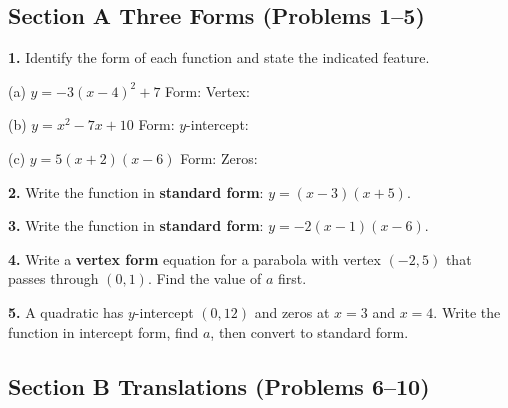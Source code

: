 \documentclass[11pt]{article}
\newcommand{\ws}[1][3cm]{\vspace{#1}}
\begin{document}
\subsection*{Section A \quad Three Forms (Problems 1--5)}

\textbf{1.} Identify the form of each function and state the indicated feature.

\hspace{1cm}(a) $y = -3(x-4)^2 + 7$ \hspace{1cm} Form: \underline{\hspace{3cm}} \hspace{0.5cm} Vertex: \underline{\hspace{2.5cm}}

\hspace{1cm}(b) $y = x^2 - 7x + 10$ \hspace{1.2cm} Form: \underline{\hspace{3cm}} \hspace{0.5cm} $y$-intercept: \underline{\hspace{1.5cm}}

\hspace{1cm}(c) $y = 5(x+2)(x-6)$ \hspace{1.1cm} Form: \underline{\hspace{3cm}} \hspace{0.5cm} Zeros: \underline{\hspace{2.5cm}}

\ws[2cm]

\textbf{2.} Write the function in \textbf{standard form}: $y = (x-3)(x+5)$.

\ws[3cm]

\textbf{3.} Write the function in \textbf{standard form}: $y = -2(x-1)(x-6)$.

\ws[3cm]

\textbf{4.} Write a \textbf{vertex form} equation for a parabola with vertex $(-2, 5)$ that passes through $(0, 1)$.
Find the value of $a$ first.

\ws[3.5cm]

\textbf{5.} A quadratic has $y$-intercept $(0, 12)$ and zeros at $x = 3$ and $x = 4$.
Write the function in intercept form, find $a$, then convert to standard form.

\ws[3.5cm]

\subsection*{Section B \quad Translations (Problems 6--10)}
\end{document}
